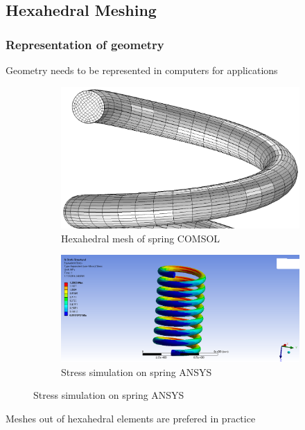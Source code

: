 \documentclass[
	11pt, %
	aspectratio=169, %
]{beamer}
\begin{document}

\subsection{Hexahedral Meshing}

\begin{frame}
	\frametitle{Representation of geometry}
    Geometry needs to be represented in computers for applications
    
    \begin{figure}
        \begin{subfigure}{0.45\textwidth}
            \centering
            \includegraphics[width=\linewidth]{spiral.png}
            \caption{Hexahedral mesh of spring \textcopyright COMSOL}
            \label{fig:sub1}
        \end{subfigure}%
        \begin{subfigure}{0.45\textwidth}
            \centering
            \includegraphics[width=\linewidth]{spring.png}
            \caption{Stress simulation on spring \textcopyright ANSYS}
            \label{fig:sub2}
        \end{subfigure}%
	\end{figure}
    Meshes out of hexahedral elements are prefered in practice
\end{frame}
\end{document}

